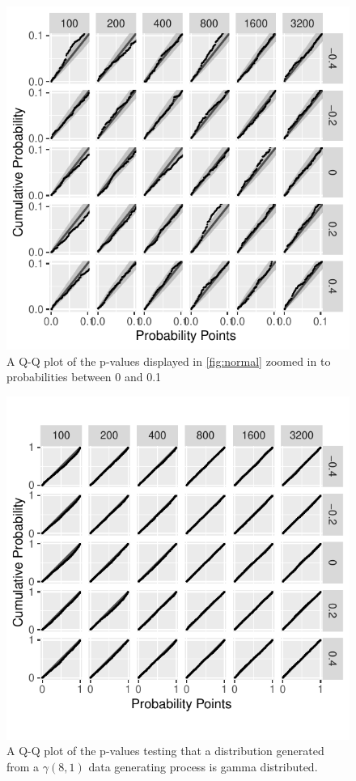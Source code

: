 \documentclass[12pt, letterpaper]{article}
\begin{document}
\begin{figure}[tbp]
  \centering
  \includegraphics[scale=1]{figures/zoom_normal}
  \caption{A Q-Q plot of the p-values displayed in \ref{fig:normal} zoomed in to 
  probabilities between 0 and
  0.1}
  \label{fig:zoom_normal}
\end{figure}

\begin{figure}[tbp]
  \centering
  \includegraphics[scale=1]{figures/gamma}
  \caption{A Q-Q plot of the p-values testing that a distribution
  generated from a $\gamma(8,1)$ data generating process is gamma distributed.}
  \label{fig:gamma}
\end{figure}
\end{document}
